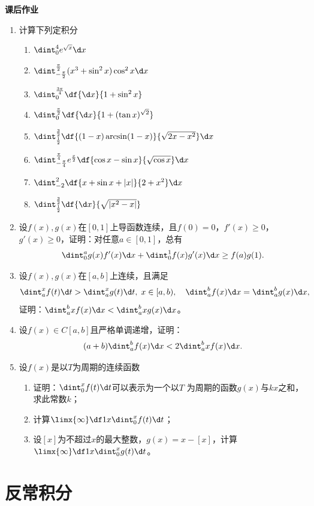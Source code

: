 \begin{ext}
	{\bf 课后作业}
	
	\begin{enumerate}
	  \item 计算下列定积分
	  \begin{enumerate}[(1)]
	    \item $\dint_0^4e^{\sqrt x}\d x$
	    \item $\dint_{-\frac{\pi}2}^{\frac{\pi}2}(x^3+\sin^2x)\cos^2x\d x$
	    \item $\dint_0^{\frac{3\pi}4}\df{\d x}{1+\sin^2x}$
	    \item $\dint_0^{\frac{\pi}2}\df{\d x}{1+(\tan x)^{\sqrt 2}}$
	    \item $\dint_{\frac12}^{\frac32}\df{(1-x)\arcsin(1-x)}{\sqrt{2x-x^2}}\d x$
	    \item $\dint_{-\frac{\pi}4}^{\frac{\pi}4}e^{\frac x2}
	    \df{\cos x-\sin x}{\sqrt{\cos x}}\d x$
	    \item $\dint_{-2}^2\df{x+\sin x+|x|}{2+x^2}\d x$
	    \item $\dint_{\frac12}^{\frac32}\df{\d x}{\sqrt{|x^2-x|}}$
	  \end{enumerate}
	  \item 设$f(x),g(x)$在$[0,1]$上导函数连续，且$f(0)=0$，$f'(x)\geq0$，
	  $g'(x)\geq0$，证明：对任意$a\in[0,1]$，总有
	  $$\dint_0^ag(x)f'(x)\d x+\dint_0^1f(x)g'(x)\d x\geq f(a)g(1).$$
	  \item 设$f(x),g(x)$在$[a,b]$上连续，且满足
	  $$\dint_a^xf(t)\d t>\dint_a^xg(t)\d t,\;x\in[a,b),
	  \quad \dint_a^bf(x)\d x=\dint_a^bg(x)\d x,$$
	  证明：$\dint_a^bxf(x)\d x<\dint_a^bxg(x)\d x$。
	  \item 设$f(x)\in C[a,b]$且严格单调递增，证明：
	  $$(a+b)\dint_a^bf(x)\d x<2\dint_a^bxf(x)\d x.$$
	  \item 设$f(x)$是以$T$为周期的连续函数
	  \begin{enumerate}[(1)]
	    \item 证明：$\dint_0^xf(t)\d t$可以表示为一个以$T$
	    为周期的函数$g(x)$与$kx$之和，求此常数$k$；
	    \item 计算$\limx{\infty}\df1x\dint_0^xf(t)\d t$；
	    \item 设$[x]$为不超过$x$的最大整数，$g(x)=x-[x]$，计算
	    $\limx{\infty}\df1x\dint_0^xg(t)\d t$。
	  \end{enumerate}
	\end{enumerate}
\end{ext}

\section{反常积分}

